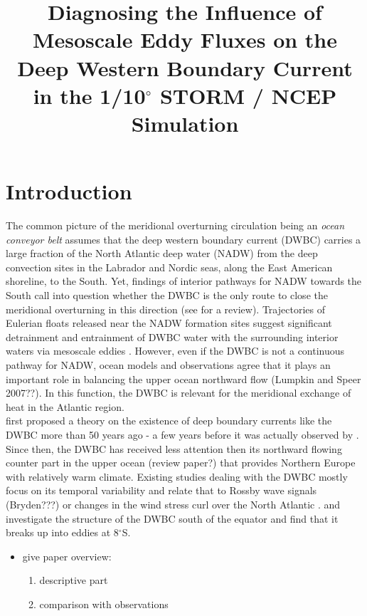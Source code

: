 \documentclass{ametsoc}
\title{Diagnosing the Influence of Mesoscale Eddy Fluxes on the Deep Western Boundary Current in the 1/10$^\circ$ STORM / NCEP Simulation}
\affiliation{}
\begin{document}
\maketitle


\section{Introduction}


The common picture of the meridional overturning circulation being an \textit{ocean conveyor belt} \citep{Broecker1991} assumes that the deep western boundary current (DWBC) carries a large fraction of the North Atlantic deep water (NADW) from the deep convection sites in the Labrador and Nordic seas, along the East American shoreline, to the South. Yet, findings of interior pathways for NADW towards the South call into question whether the DWBC is the only route to close the meridional overturning in this direction (see \citep{Lozier2010} for a review). Trajectories of Eulerian floats released near the NADW formation sites suggest significant detrainment and entrainment of DWBC water with the surrounding interior waters via mesoscale eddies \citep{Fischer2002, Bower2009}. However, even if the DWBC is not a continuous pathway for NADW, ocean models and observations agree that it plays an important role in balancing the upper ocean northward flow  (Lumpkin and Speer 2007??). In this function, the DWBC is relevant for the meridional exchange of heat in the Atlantic region.\\
\citet{Stommel1959} first proposed a theory on the existence of deep boundary currents like the DWBC more than 50 years ago - a few years before it was actually observed by \citet{Swallow1961}. Since then, the DWBC has received less attention then its northward flowing counter part in the upper ocean (review paper?) that provides Northern Europe with relatively warm climate. Existing studies dealing with the DWBC mostly focus on its temporal variability and relate that to  Rossby wave signals \citep{Boning} (Bryden???) or changes in the wind stress curl over the North Atlantic \citep{Lee1996}. \citet{Dengler2004} and \citet{Schott2005} investigate the structure of the DWBC south of the equator and find that it breaks up into eddies at 8$^\circ$S. 

\begin{itemize}
\item give paper overview:
\begin{enumerate}
\item descriptive part
\item comparison with observations
\end{enumerate}
\end{itemize}
\end{document}
